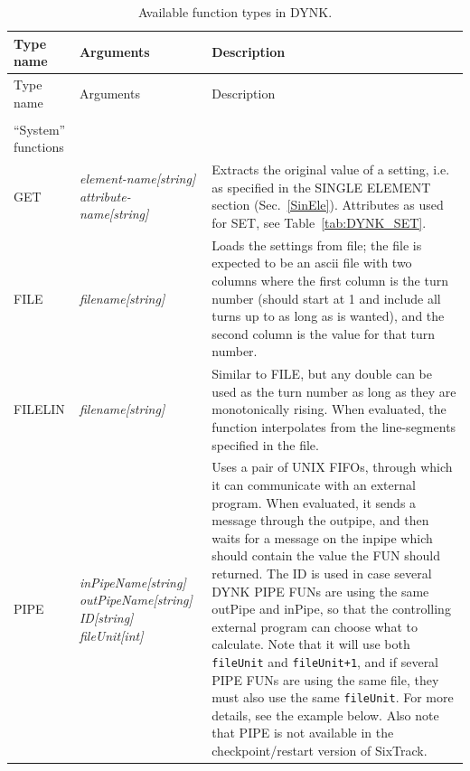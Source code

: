\documentclass[a4paper,11pt]{report}
\begin{document}
\pagebreak
\begin{center}
\begin{longtable}{|p{2.25cm} | p{4cm} p{9.5cm}|}
  \caption{Available function types in DYNK.}
  \label{tab:DYNK_FUN} \\*
  \hline
  \rowcolor{blue!30}
  Type name & Arguments & Description \\*
  \hline
  \endfirsthead

  \hline
  \rowcolor{blue!30}
  Type name & Arguments & Description \\*
  \endhead

  \rowcolor{gray!15}
  \multicolumn{3}{|c|}{(The table continues on the next page)}\\*
  \hline
  \endfoot
  
  \hline
  \endlastfoot

  \rowcolor{blue!15}
  ``System'' functions & & \\*

  GET        & \emph{element-name[string] attribute-name[string]} & 
  Extracts the original value of a setting, i.e. as specified in the SINGLE ELEMENT section (Sec.~\ref{SinEle}). Attributes as used for SET, see Table~\ref{tab:DYNK_SET}. \\*

  FILE       & \emph{filename[string]} &
  Loads the settings from file; the file is expected to be an ascii file with two columns where the first column is the turn number (should start at 1 and include all turns up to as long as is wanted), and the second column is the value for that turn number.\\*
  
  FILELIN    & \emph{filename[string]} &
  Similar to FILE, but any double can be used as the turn number as long as they are monotonically rising.
  When evaluated, the function interpolates from the line-segments specified in the file. \\*
  
  PIPE       & \emph{inPipeName[string] outPipeName[string] ID[string] fileUnit[int]} &
  Uses a pair of UNIX FIFOs, through which it can communicate with an external program.
  When evaluated, it sends a message through the outpipe, and then waits for a message on the inpipe which should contain the value the FUN should returned.
  The ID is used in case several DYNK PIPE FUNs are using the same outPipe and inPipe, so that the controlling external program can choose what to calculate.
  Note that it will use both \texttt{fileUnit} and \texttt{fileUnit+1}, and if several PIPE FUNs are using the same file, they must also use the same \texttt{fileUnit}.
  For more details, see the example below.
  Also note that PIPE is not available in the checkpoint/restart version of SixTrack.\\*
  

\end{longtable}
\end{center}
\end{document}
